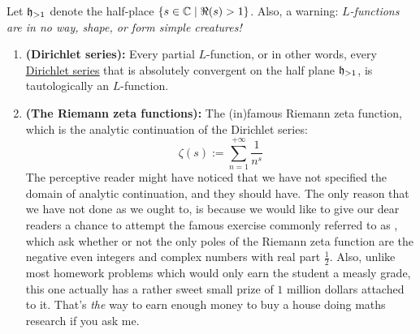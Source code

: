                 \begin{example}
                    Let $\mathfrak{h}_{> 1}$ denote the half-place $\{s \in \mathbb{C} \mid \Re(s) > 1\}$. Also, a warning: \textit{$L$-functions are in no way, shape, or form simple creatures!}
                    \begin{enumerate}
                        \item \textbf{(Dirichlet series):}  Every partial $L$-function, or in other words, every \href{https://en.wikipedia.org/wiki/Dirichlet_series}{\underline{Dirichlet series}} that is absolutely convergent on the half plane $\mathfrak{h}_{> 1}$, is tautologically an $L$-function. 
                        \item \textbf{(The Riemann zeta functions):}  The (in)famous Riemann zeta function, which is the analytic continuation of the Dirichlet series:
                            $$\zeta(s) := \sum_{n = 1}^{+\infty} \frac{1}{n^s}$$
                        The perceptive reader might have noticed that we have not specified the domain of analytic continuation, and they should have. The only reason that we have not done as we ought to, is because we would like to give our dear readers a chance to attempt the famous exercise commonly referred to as , which ask whether or not the only poles of the Riemann zeta function are the negative even integers and complex numbers with real part $\frac12$. Also, unlike most homework problems which would only earn the student a measly grade, this one actually has a rather sweet small prize of $1$ million dollars attached to it. That's \textit{the} way to earn enough money to buy a house doing maths research if you ask me.
                        

\end{enumerate}
\end{example}
